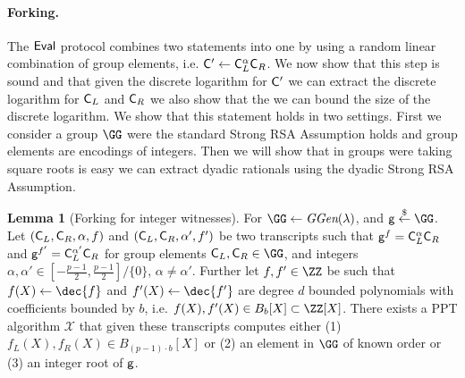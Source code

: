 \documentclass{article}
\theoremstyle{definition}
\newtheorem{lemma}{Lemma}
\begin{document}
\paragraph{Forking.} The $\textsf{{Eval}}$ protocol combines two statements into one by using a random linear combination of group elements, i.e. $\mathsf{C}'\gets \mathsf{C}_L^{\alpha}\mathsf{C}_R$. We now show that this step is sound and that given the discrete logarithm for $\mathsf{C}'$ we can extract the discrete logarithm for $\mathsf{C}_L$ and $\mathsf{C}_R$ we also show that the we can bound the size of the discrete logarithm. We show that this statement holds in two settings. First we consider a group $\GG$ were the standard Strong RSA Assumption holds and group elements are encodings of integers. Then we will show that in groups were taking square roots is easy we can extract dyadic rationals using the dyadic Strong RSA Assumption.
\begin{lemma}[Forking for integer witnesses]
	For $\GG \gets \ggen(\lambda)$, and $\gr{g}\sample \GG$. 
	Let $(\mathsf{C}_L,\mathsf{C}_R,\alpha,f)$ and  $(\mathsf{C}_L,\mathsf{C}_R,\alpha',f')$ be two transcripts such that $\mathsf{g}^{f}=\mathsf{C}_L^{\alpha}\mathsf{C}_R$ and $\mathsf{g}^{f'}=\mathsf{C}_L^{\alpha'}\mathsf{C}_R$ for group elements $\gr{C}_L,\gr{C}_R \in \GG$, and integers $\alpha,\alpha' \in  [-\frac{p-1}{2},\frac{p-1}{2}]/\{0\}$, $\alpha\neq \alpha'$. Further let $f,f'\in \ZZ$ be such that $f(X)\gets\dec{f}$ and $f'(X)\gets\dec{f'}$ are degree $d$ bounded polynomials with coefficients bounded by $b$, i.e. $f(X),f'(X)\in B_{b}[X]\subset \ZZ[X]$.
	 There exists a PPT algorithm $\mathcal{X}$ that given these transcripts computes either (1) $f_L(X),f_R(X)\in B_{(p-1) \cdot b}[X]$ or (2) an element in $\GG$ of known order or (3) an integer root of $\mathsf{g}$.
\end{lemma}
\end{document}
